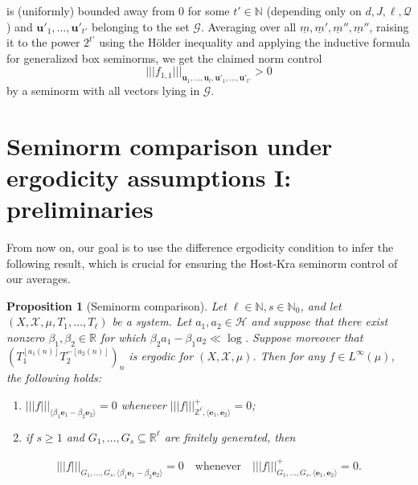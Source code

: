 \documentclass[11pt]{amsart}
\newtheorem{proposition}[lemma]{Proposition}
\theoremstyle{definition}
\newcommand{\N}{{\mathbb N}}
\newcommand{\R}{{\mathbb R}}
\newcommand{\Z}{{\mathbb Z}}
\newcommand{\CG}{{\mathcal G}}
\newcommand{\CH}{{\mathcal H}}
\newcommand{\CQ}{{\mathcal Q}}
\newcommand{\CX}{{\mathcal X}}
\newcommand{\be}{{\mathbf{e}}}
\newcommand{\bu}{{\mathbf{u}}}
\newcommand{\bv}{{\mathbf{v}}}
\newcommand{\um}{{\underline{m}}}
\newcommand{\nnorm}[1]{\lvert\!|\!| #1|\!|\!\rvert}
\newcommand{\1}{{\mathbf{1}}}
\newcommand{\floor}[1]{{\left \lfloor #1 \right \rfloor}}
\begin{document}
           is (uniformly) bounded away from 0
         for some $t'\in\N$ (depending only on $d,J,\ell,\CQ$) and $\bu'_{1},\dots,\bu'_{t'}$ belonging to the set $\CG$.
   Averaging over all $\um,\um',\um'',\um''$, raising it to the power $2^{t'}$ using the H{\"o}lder inequality and applying the inductive formula for generalized box seminorms, we get the claimed norm control
       $$\nnorm{f_{1,1}}_{\bu_{1},\dots,\bu_{t},\bu'_{1},\dots,\bu'_{t'}}>0$$
by a seminorm with all vectors lying in $\CG$.

  
\section{Seminorm comparison under ergodicity assumptions I: preliminaries}\label{S: seminorm comparison I}
From now on, our goal is to use the difference ergodicity condition to infer the following result, which is crucial for ensuring the Host-Kra seminorm control of our averages.
\begin{proposition}[Seminorm comparison]\label{P: seminorm comparison}
    Let $\ell\in\N, s\in\N_0$, and let $(X, \CX, \mu, T_1, \ldots, T_\ell)$ be a system. 
    Let $a_1, a_2\in\CH$
    and suppose that there exist nonzero $\beta_1, \beta_2\in\R$ for which $\beta_2 a_1 - \beta_1 a_2 \ll \log$. Suppose moreover that $(T_1^{\floor{a_1(n)}}T_2^{-\floor{a_2(n)}})_n$ is ergodic for $(X, \CX, \mu)$.    Then for any $f\in L^\infty(\mu)$, the following holds:
    \begin{enumerate}
        \item $\nnorm{f}_{\langle\beta_1 \be_1 - \beta_2 \be_2\rangle} = 0$ whenever $\nnorm{f}_{\Z^\ell, \langle\be_1, \be_2\rangle}^+ = 0$;
        \item if $s\geq 1$ and $G_1, \ldots, G_s\subseteq\R^\ell$ are finitely generated, then 
    \end{enumerate}
    \begin{align*}%
        \nnorm{f}_{G_1, \ldots, G_s, \langle\beta_1 \be_1 - \beta_2 \be_2\rangle} = 0 \quad \textrm{whenever} \quad \nnorm{f}_{G_1, \ldots, G_s, \langle\be_1, \be_2\rangle}^+ = 0.
    \end{align*}
\end{proposition}
\end{document}
